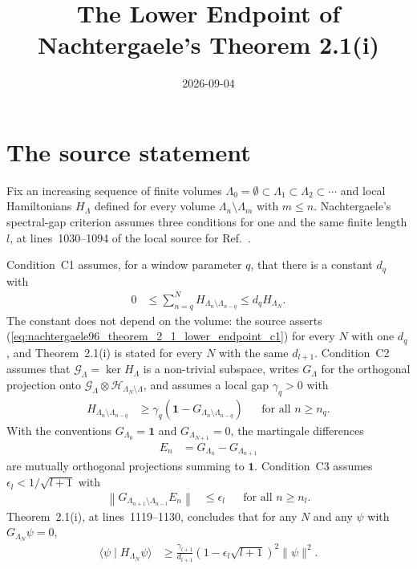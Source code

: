 \documentclass{article}
\title{The Lower Endpoint of Nachtergaele's Theorem 2.1(i)}
\author{}
\date{2026-09-04}
\begin{document}
\maketitle
{}

\section{The source statement}

Fix an increasing sequence of finite volumes
$\Lambda_0=\emptyset\subset\Lambda_1\subset\Lambda_2\subset\cdots$ and local
Hamiltonians $H_\Lambda$ defined for every volume $\Lambda_n\setminus\Lambda_m$
with $m\leq n$. Nachtergaele's spectral-gap criterion assumes three
conditions for one and the same finite length $l$, at
lines~1030--1094 of the local source for
Ref.~\cite{Nachtergaele1996Spectral}.

Condition~C1 assumes, for a window parameter $q$, that there is a constant
$d_q$ with
\begin{align}
    0
        &\leq\sum_{n=q}^{N}H_{\Lambda_n\setminus\Lambda_{n-q}}
         \leq d_qH_{\Lambda_N}.
    \label{eq:nachtergaele96_theorem_2_1_lower_endpoint_c1}
\end{align}
The constant does not depend on the volume: the source asserts
(\ref{eq:nachtergaele96_theorem_2_1_lower_endpoint_c1}) for every $N$ with one
$d_q$, and Theorem~2.1(i) is stated for every $N$ with the same $d_{l+1}$.
Condition~C2 assumes that $\mathcal G_\Lambda=\ker H_\Lambda$ is a non-trivial
subspace, writes $G_\Lambda$ for the orthogonal projection onto
$\mathcal G_\Lambda\otimes\mathcal H_{\Lambda_N\setminus\Lambda}$, and assumes
a local gap $\gamma_q>0$ with
\begin{align}
    H_{\Lambda_n\setminus\Lambda_{n-q}}
        &\geq\gamma_q\left(\mathbf 1-G_{\Lambda_n\setminus\Lambda_{n-q}}\right)
        &&\text{for all }n\geq n_q.
    \label{eq:nachtergaele96_theorem_2_1_lower_endpoint_c2}
\end{align}
With the conventions $G_{\Lambda_0}=\mathbf 1$ and $G_{\Lambda_{N+1}}=0$, the
martingale differences
\begin{align}
    E_n
        &=G_{\Lambda_n}-G_{\Lambda_{n+1}}
    \label{eq:nachtergaele96_theorem_2_1_lower_endpoint_martingale_difference}
\end{align}
are mutually orthogonal projections summing to $\mathbf 1$. Condition~C3
assumes $\epsilon_l<1/\sqrt{l+1}$ with
\begin{align}
    \left\lVert G_{\Lambda_{n+1}\setminus\Lambda_{n-l}}E_n\right\rVert
        &\leq\epsilon_l
        &&\text{for all }n\geq n_l.
    \label{eq:nachtergaele96_theorem_2_1_lower_endpoint_c3}
\end{align}
Theorem~2.1(i), at lines~1119--1130, concludes that for any $N$ and any $\psi$
with $G_{\Lambda_N}\psi=0$,
\begin{align}
    \langle\psi\mid H_{\Lambda_N}\psi\rangle
        &\geq\frac{\gamma_{l+1}}{d_{l+1}}
             \left(1-\epsilon_l\sqrt{l+1}\right)^2
             \lVert\psi\rVert^2.
    \label{eq:nachtergaele96_theorem_2_1_lower_endpoint_conclusion}
\end{align}
\end{document}
